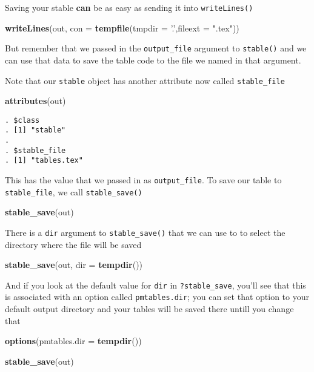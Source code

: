 \documentclass[
]{book}
\newenvironment{Shaded}{\begin{snugshade}}{\end{snugshade}}
\newcommand{\DataTypeTok}[1]{\textcolor[rgb]{0.13,0.29,0.53}{#1}}
\newcommand{\KeywordTok}[1]{\textcolor[rgb]{0.13,0.29,0.53}{\textbf{#1}}}
\newcommand{\NormalTok}[1]{#1}
\newcommand{\StringTok}[1]{\textcolor[rgb]{0.31,0.60,0.02}{#1}}
\begin{document}
Saving your stable \textbf{can} be as easy as sending it into \texttt{writeLines()}

\begin{Shaded}
\begin{Highlighting}[]
\KeywordTok{writeLines}\NormalTok{(out, }\DataTypeTok{con =} \KeywordTok{tempfile}\NormalTok{(}\DataTypeTok{tmpdir =} \StringTok{'.'}\NormalTok{,}\DataTypeTok{fileext =} \StringTok{".tex"}\NormalTok{))}
\end{Highlighting}
\end{Shaded}

But remember that we passed in the \texttt{output\_file} argument to \texttt{stable()}
and we can use that data to save the table code to the file we named
in that argument.

Note that our \texttt{stable} object has another attribute now called \texttt{stable\_file}

\begin{Shaded}
\begin{Highlighting}[]
\KeywordTok{attributes}\NormalTok{(out)}
\end{Highlighting}
\end{Shaded}

\begin{verbatim}
. $class
. [1] "stable"
. 
. $stable_file
. [1] "tables.tex"
\end{verbatim}

This has the value that we passed in as \texttt{output\_file}. To save our table
to \texttt{stable\_file}, we call \texttt{stable\_save()}

\begin{Shaded}
\begin{Highlighting}[]
\KeywordTok{stable_save}\NormalTok{(out)}
\end{Highlighting}
\end{Shaded}

There is a \texttt{dir} argument to \texttt{stable\_save()} that we can use to to select
the directory where the file will be saved

\begin{Shaded}
\begin{Highlighting}[]
\KeywordTok{stable_save}\NormalTok{(out, }\DataTypeTok{dir =} \KeywordTok{tempdir}\NormalTok{())}
\end{Highlighting}
\end{Shaded}

And if you look at the default value for \texttt{dir} in \texttt{?stable\_save}, you'll
see that this is associated with an option called \texttt{pmtables.dir}; you
can set that option to your default output directory and your tables
will be saved there untill you change that

\begin{Shaded}
\begin{Highlighting}[]
\KeywordTok{options}\NormalTok{(}\DataTypeTok{pmtables.dir =} \KeywordTok{tempdir}\NormalTok{())}

\KeywordTok{stable_save}\NormalTok{(out)}
\end{Highlighting}
\end{Shaded}

  
\end{document}
